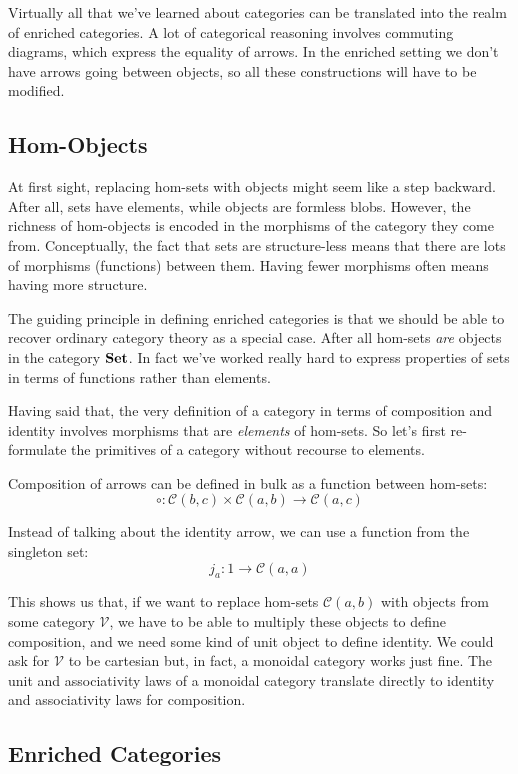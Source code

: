 \documentclass[DaoFP]{subfiles}
\begin{document}
Virtually all that we've learned about categories can be translated into the realm of enriched categories. A lot of categorical reasoning involves commuting diagrams, which express the equality of arrows. In the enriched setting we don't have arrows going between objects, so all these constructions will have to be modified.

\subsection{Hom-Objects}

At first sight, replacing hom-sets with objects might seem like a step backward. After all, sets have elements, while objects are formless blobs. However, the richness of hom-objects is encoded in the morphisms of the category they come from. Conceptually, the fact that sets are structure-less means that there are lots of morphisms (functions) between them. Having fewer morphisms often means having more structure. 

The guiding principle in defining enriched categories is that we should be able to recover ordinary category theory as a special case. After all hom-sets \emph{are} objects in the category $\mathbf{Set}$. In fact we've worked really hard to express properties of sets in terms of functions rather than elements. 

Having said that, the very definition of a category in terms of composition and identity involves morphisms that are \emph{elements} of hom-sets. So let's first re-formulate the primitives of a category without recourse to elements. 

Composition of arrows can be defined in bulk as a function between hom-sets:
\[ \circ \colon \mathcal C (b, c) \times \mathcal C (a, b) \to \mathcal C (a, c) \]

Instead of talking about the identity arrow, we can use a function from the singleton set:
\[ j_a \colon 1 \to \mathcal C (a, a) \]

This shows us that, if we want to replace hom-sets $\mathcal C (a, b)$ with objects from some category $\mathcal V$, we have to be able to multiply these objects to define composition, and we need some kind of unit object to define identity. We could ask for $\mathcal V$ to be cartesian but, in fact, a monoidal category works just fine. The unit and associativity laws of a monoidal category translate directly to identity and associativity laws for composition. 

\subsection{Enriched Categories}
\end{document}
